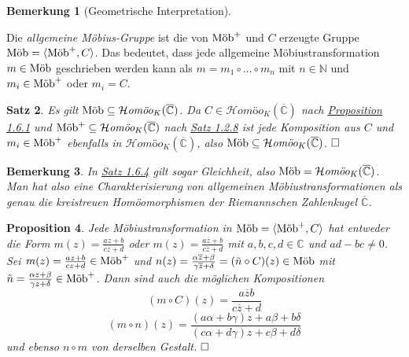 \documentclass[11pt]{book}
\numberwithin{dummy}{section}
\newtheorem{theorem}{Satz}[section]
\newtheorem{proposition}[theorem]{Proposition}
\newtheorem{remark}[theorem]{Bemerkung}
\theoremstyle{nonumberbreak}
\newenvironment{defin}[1][]{\ifthenelse{\equal{#1}{}}{\definition}{\definition[#1]}\rm}{\enddefinition}
\newenvironment{pr}[1][]{\ifthenelse{\equal{#1}{}}{\proof}{\proof[#1]}\rm}{\endproof}
\newcommand{\C}{\mathbb{C}}
\newcommand{\CC}{\overline{\mathbb{C}}}
\newcommand{\homoekcc}{\mathcal{H}\textit{omöo}_K(\CC)}
\newcommand{\mob}{\textup{Möb}^+}
\newcommand{\amob}{\textup{Möb}}
\begin{document}
\begin{spacing}{1.4}
\begin{remark}[Geometrische Interpretation]
\end{remark}


\begin{defin}
Die \textit{allgemeine Möbius-Gruppe} ist die von $\mob$ und $C$ erzeugte Gruppe $\amob = \langle \mob, C \rangle$. Das bedeutet, dass jede allgemeine Möbiustransformation $m \in \amob$ geschrieben werden kann als
$m= m_1 \circ \ldots\circ m_n$
mit $n \in \mathbb{N}$ und $m_i \in \mob$ oder $m_i =C$. 

\end{defin}

\hypertarget{satzeinssechsvier}{}
\begin{theorem}   %
Es gilt $\amob \subseteq \homoekcc$.
\begin{pr}
Da $C \in \homoekcc$ nach \hyperlink{propeinssechseins}{Proposition 1.6.1} und $\mob \subseteq \homoekcc$ nach \hyperlink{satzeinszweiacht}{Satz 1.2.8} ist jede Komposition aus $C$ und $m_i \in \mob$ ebenfalls in $\homoekcc$, also $\amob \subseteq \homoekcc$. $\hfill \Box$
\end{pr}

\end{theorem}

\begin{remark}
In \hyperlink{satzeinssechsvier}{Satz 1.6.4} gilt sogar Gleichheit, also $\amob = \homoekcc$. Man hat also eine Charakterisierung von allgemeinen Möbiustransformationen als genau die kreistreuen Homöomorphismen der Riemannschen Zahlenkugel $\CC$.
\end{remark}


\hypertarget{propeinssechssechs}{}
\begin{proposition} %
 Jede Möbiustransformation in $\amob = \langle \mob, C\rangle$ hat entweder die Form $m(z)= \frac{az+b}{cz+d}$ oder $m(z)= \frac{a \overline{z}+b}{c\overline{z}+d}$ mit $a,b,c,d \in \C$ und $ad-bc \neq 0$.
\begin{pr}
Sei $m(z) = \frac{az+b}{cz+d} \in \mob$ und $n(z) = \frac{\alpha\overline{z} + \beta}{\gamma \overline{z} + \delta} = (\tilde{n} \circ C)(z) \in \amob$ mit $\tilde{n} = \frac{\alpha z + \beta}{\gamma z + \delta} \in \mob$. Dann sind auch die möglichen Kompositionen 
$$(m \circ C)(z) = \frac{a \overline{z} b}{c \overline{z} +d}$$
$$(m \circ n)(z) = \frac{(a\alpha + b \gamma)z + a\beta + b \delta}{(c \alpha + d\gamma)z + c \beta + d \delta}$$
und ebenso $n \circ m$ von derselben Gestalt. $\hfill \Box$

\end{pr}


\end{proposition}
\end{spacing}
\end{document}
